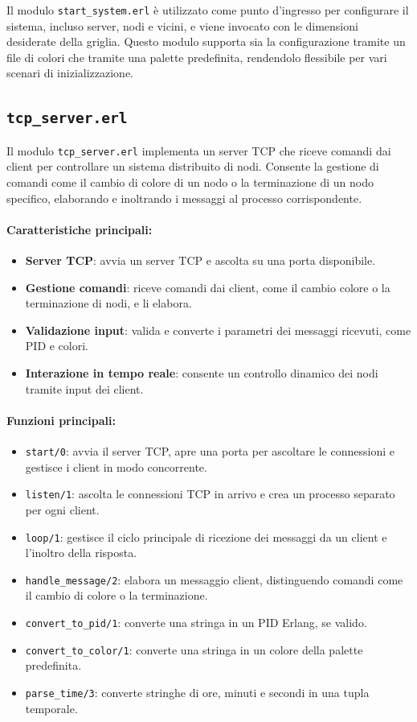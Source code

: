 \documentclass[12pt, a4paper]{report}
\begin{document}
\noindent
Il modulo \texttt{start\_system.erl} \`e utilizzato come punto d'ingresso per configurare il sistema, incluso server, nodi e vicini, e viene invocato con le dimensioni desiderate della griglia. Questo modulo supporta sia la configurazione tramite un file di colori che tramite una palette predefinita, rendendolo flessibile per vari scenari di inizializzazione.

\subsection{\texttt{tcp\_server.erl}}

Il modulo \texttt{tcp\_server.erl} implementa un server TCP che riceve comandi dai client per controllare un sistema distribuito di nodi. Consente la gestione di comandi come il cambio di colore di un nodo o la terminazione di un nodo specifico, elaborando e inoltrando i messaggi al processo corrispondente.

\paragraph{Caratteristiche principali:}
\begin{itemize}
    \item \textbf{Server TCP}: avvia un server TCP e ascolta su una porta disponibile.
    \item \textbf{Gestione comandi}: riceve comandi dai client, come il cambio colore o la terminazione di nodi, e li elabora.
    \item \textbf{Validazione input}: valida e converte i parametri dei messaggi ricevuti, come PID e colori.
    \item \textbf{Interazione in tempo reale}: consente un controllo dinamico dei nodi tramite input dei client.
\end{itemize}

\paragraph{Funzioni principali:}
\begin{itemize}
    \item \texttt{start/0}: avvia il server TCP, apre una porta per ascoltare le connessioni e gestisce i client in modo concorrente.
    \item \texttt{listen/1}: ascolta le connessioni TCP in arrivo e crea un processo separato per ogni client.
    \item \texttt{loop/1}: gestisce il ciclo principale di ricezione dei messaggi da un client e l'inoltro della risposta.
    \item \texttt{handle\_message/2}: elabora un messaggio client, distinguendo comandi come il cambio di colore o la terminazione.
    \item \texttt{convert\_to\_pid/1}: converte una stringa in un PID Erlang, se valido.
    \item \texttt{convert\_to\_color/1}: converte una stringa in un colore della palette predefinita.
    \item \texttt{parse\_time/3}: converte stringhe di ore, minuti e secondi in una tupla temporale.
\end{itemize}
\end{document}
